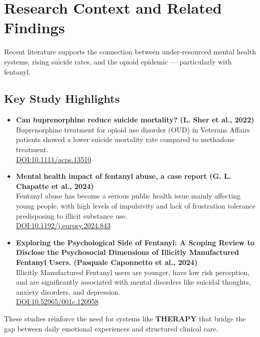 
\section{Research Context and Related Findings}

Recent literature supports the connection between under-resourced mental health systems, rising suicide rates, and the opioid epidemic — particularly with fentanyl.

\subsection*{Key Study Highlights}

\begin{itemize}
\item \textbf{Can buprenorphine reduce suicide mortality? (L. Sher et al., 2022)}\\
    Buprenorphine treatment for opioid use disorder (OUD) in Veterans Affairs patients showed a lower suicide mortality rate compared to methadone treatment.\\
    \href{https://doi.org/10.1111/acps.13510}{DOI:10.1111/acps.13510}
    
\item \textbf{Mental health impact of fentanyl abuse, a case report (G. L. Chapatte et al., 2024)}\\
    Fentanyl abuse has become a serious public health issue mainly affecting young people, with high levels of impulsivity and lack of frustration tolerance predisposing to illicit substance use.\\
    \href{https://doi.org/10.1192/j.eurpsy.2024.843}{DOI:10.1192/j.eurpsy.2024.843}
    
\item \textbf{Exploring the Psychological Side of Fentanyl: A Scoping Review to Disclose the Psychosocial Dimensions of Illicitly Manufactured Fentanyl Users. (Pasquale Caponnetto et al., 2024)}\\
    Illicitly Manufactured Fentanyl users are younger, have low risk perception, and are significantly associated with mental disorders like suicidal thoughts, anxiety disorders, and depression.\\
    \href{https://doi.org/10.52965/001c.120958}{DOI:10.52965/001c.120958}
    
\end{itemize}

\noindent These studies reinforce the need for systems like \textbf{THERAPY} that bridge the gap between daily emotional experiences and structured clinical care.
